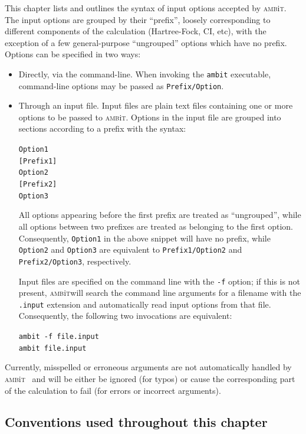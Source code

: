 \documentclass{report}
\newcommand{\ambit}{\textsc{amb}{\footnotesize i}\textsc{t}}
\begin{document}
This chapter lists and outlines the syntax of input options accepted by \ambit. The input options are
grouped by their ``prefix'', loosely corresponding to different components of the calculation
(Hartree-Fock, CI, etc), with the exception of a few general-purpose ``ungrouped'' options which have no
prefix. Options can be specified in two ways:
\begin{itemize}
\item Directly, via the command-line. When invoking the \texttt{ambit} executable, command-line options 
may be passed as \texttt{Prefix/Option}.
\item Through an input file. Input files are plain text files containing one or more options to be
passed to \ambit. Options in the input file are grouped into sections according to a prefix with the
syntax:

\texttt{Option1}\\
\texttt{[Prefix1]}\\
\texttt{Option2}\\
\texttt{[Prefix2]}\\
\texttt{Option3}

All options appearing before the first prefix are treated as ``ungrouped'', while all options between
two prefixes are treated as belonging to the first option. Consequently, \texttt{Option1} in the above
snippet will have no prefix, while \texttt{Option2} and \texttt{Option3} are equivalent to
\texttt{Prefix1/Option2} and \texttt{Prefix2/Option3}, respectively.

Input files are specified on the command line with the \texttt{-f} option; if this is not present,
\ambit will search the command line arguments for a filename with the \texttt{.input} extension and
automatically read input options from that file. Consequently, the following two invocations are
equivalent:

\texttt{ambit -f file.input}\\
\texttt{ambit file.input}
\end{itemize}

Currently, misspelled or erroneous arguments are not automatically handled by \ambit ~
and will be either be ignored (for typos) or cause the corresponding part of the calculation to fail 
(for errors or incorrect arguments).

\subsection{Conventions used throughout this chapter}
\end{document}
